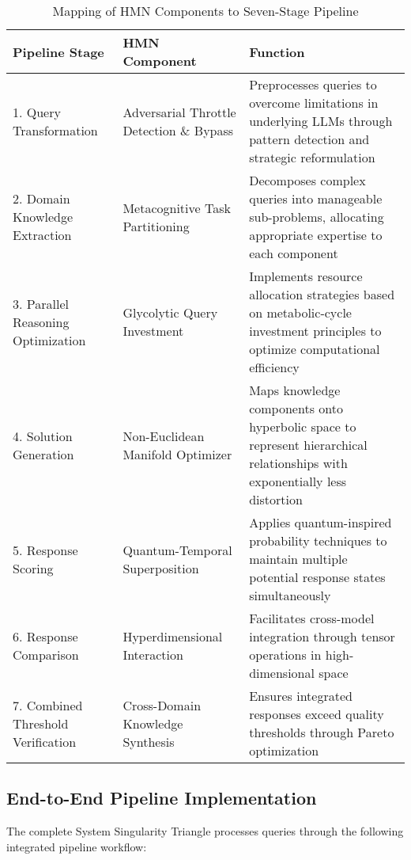 \documentclass[journal,onecolumn]{IEEEtran}
\begin{document}
\begin{table}[ht]
\centering
\caption{Mapping of HMN Components to Seven-Stage Pipeline}
\label{tab:pipeline-mapping}
\begin{tabular}{llp{7cm}}
\toprule
\textbf{Pipeline Stage} & \textbf{HMN Component} & \textbf{Function} \\
\midrule
1. Query Transformation & Adversarial Throttle Detection \& Bypass & Preprocesses queries to overcome limitations in underlying LLMs through pattern detection and strategic reformulation \\
\midrule
2. Domain Knowledge Extraction & Metacognitive Task Partitioning & Decomposes complex queries into manageable sub-problems, allocating appropriate expertise to each component \\
\midrule
3. Parallel Reasoning Optimization & Glycolytic Query Investment & Implements resource allocation strategies based on metabolic-cycle investment principles to optimize computational efficiency \\
\midrule
4. Solution Generation & Non-Euclidean Manifold Optimizer & Maps knowledge components onto hyperbolic space to represent hierarchical relationships with exponentially less distortion \\
\midrule
5. Response Scoring & Quantum-Temporal Superposition & Applies quantum-inspired probability techniques to maintain multiple potential response states simultaneously \\
\midrule
6. Response Comparison & Hyperdimensional Interaction & Facilitates cross-model integration through tensor operations in high-dimensional space \\
\midrule
7. Combined Threshold Verification & Cross-Domain Knowledge Synthesis & Ensures integrated responses exceed quality thresholds through Pareto optimization \\
\bottomrule
\end{tabular}
\end{table}

\subsection{End-to-End Pipeline Implementation}

The complete System Singularity Triangle processes queries through the following integrated pipeline workflow:
\end{document}
